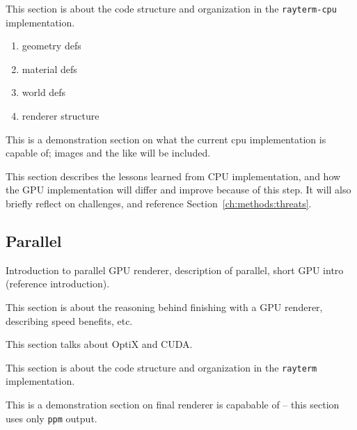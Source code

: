  \label{ch:methods:renderer:sequential:design}

This section is about the code structure and organization in the \texttt{rayterm-cpu} implementation.

\begin{enumerate}
  \item geometry defs
  \item material defs
  \item world defs
  \item renderer structure
\end{enumerate}

 \label{ch:methods:renderer:sequential:proto}

This is a demonstration section on what the current cpu implementation is capable of; images and the like will be included.

 \label{ch:methods:renderer:sequential:takeaway}

This section describes the lessons learned from CPU implementation, and how the GPU implementation will differ and improve because of this step. It will also briefly reflect on challenges, and reference Section~\ref{ch:methods:threats}.

\subsection{Parallel} \label{ch:methods:renderer:parallel}

Introduction to parallel GPU renderer, description of parallel, short GPU intro (reference introduction).

 \label{ch:methods:renderer:parallel:motivation}

This section is about the reasoning behind finishing with a GPU renderer, describing speed benefits, etc.

 \label{ch:methods:renderer:parallel:libraries}

This section talks about OptiX and CUDA.

 \label{ch:methods:renderer:parallel:design}

This section is about the code structure and organization in the \texttt{rayterm} implementation.

 \label{ch:methods:renderer:parallel:demo}

This is a demonstration section on final renderer is capabable of -- this section uses only \texttt{ppm} output.

